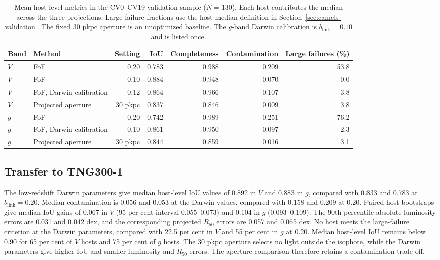 \documentclass[usenatbib]{mnras}
\begin{document}
\begin{table}
\centering
\caption{Mean host-level metrics in the CV0--CV19 validation sample
($N=130$). Each host contributes the median across the three projections.
Large-failure fractions use the host-median definition in
Section~\ref{sec:camels-validation}. The fixed 30 pkpc aperture is an
unoptimized baseline. The $g$-band Darwin calibration is
$b_{\mathrm{link}}=0.10$ and is listed once.}
\label{tab:camels-validation}
\small
\begin{tabular}{llrrrrr}
\toprule
Band & Method & Setting & IoU & Completeness & Contamination & Large failures (\%) \\
\midrule
$V$ & FoF & 0.20 & 0.783 & 0.988 & 0.209 & 53.8 \\
$V$ & FoF & 0.10 & 0.884 & 0.948 & 0.070 & 0.0 \\
$V$ & FoF, Darwin calibration & 0.12 & 0.864 & 0.966 & 0.107 & 3.8 \\
$V$ & Projected aperture & 30 pkpc & 0.837 & 0.846 & 0.009 & 3.8 \\
$g$ & FoF & 0.20 & 0.742 & 0.989 & 0.251 & 76.2 \\
$g$ & FoF, Darwin calibration & 0.10 & 0.861 & 0.950 & 0.097 & 2.3 \\
$g$ & Projected aperture & 30 pkpc & 0.844 & 0.859 & 0.016 & 3.1 \\
\bottomrule
\end{tabular}
\end{table}

\subsection{Transfer to TNG300-1}
\label{sec:tngresults}

The low-redshift Darwin parameters give median host-level IoU values of
0.892 in $V$ and 0.883 in $g$, compared with 0.833 and 0.783 at
$b_{\mathrm{link}}=0.20$. Median contamination is 0.056 and 0.053 at the
Darwin values, compared with 0.158 and 0.209 at 0.20. Paired host
bootstraps give median IoU gains of 0.067 in $V$ (95 per cent interval
0.055--0.073) and 0.104 in $g$ (0.093--0.109). The 90th-percentile
absolute luminosity errors are 0.031 and 0.042 dex, and the corresponding
projected $R_{50}$ errors are 0.057 and 0.065 dex. No host meets the
large-failure criterion at the Darwin parameters, compared with 22.5 per
cent in $V$ and 55 per cent in $g$ at 0.20. Median host-level IoU remains
below 0.90 for 65 per cent of $V$ hosts and 75 per cent of $g$ hosts.
The 30 pkpc aperture selects no light outside the isophote, while the
Darwin parameters give higher IoU and smaller luminosity and $R_{50}$
errors. The aperture comparison therefore retains a contamination
trade-off.
\end{document}
